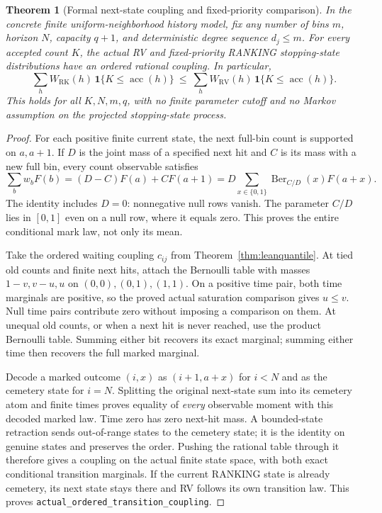 \documentclass[11pt]{article}
\newtheorem{theorem}{Theorem}
\newcommand{\RV}{\mathrm{RV}}
\newcommand{\RK}{\mathrm{RK}}
\begin{document}
\begin{theorem}[Formal next-state coupling and fixed-priority comparison]\label{thm:leanjoint}
In the concrete finite uniform-neighborhood history model, fix any
number of bins $m$, horizon $N$, capacity $q+1$, and deterministic degree
sequence $d_j\leq m$. For every accepted count $K$, the actual RV and
fixed-priority RANKING stopping-state distributions have an ordered
rational coupling. In particular,
\[
 \sum_h W_{\RK}(h)\,\mathbf 1\{K\leq\operatorname{acc}(h)\}
 \ \leq\
 \sum_h W_{\RV}(h)\,\mathbf 1\{K\leq\operatorname{acc}(h)\}.
\]
This holds for all $K,N,m,q$, with no finite parameter cutoff and no
Markov assumption on the projected stopping-state process.
\end{theorem}
\begin{proof}
For each positive finite current state, the next full-bin count is
supported on $a,a+1$. If $D$ is the joint mass of a specified next hit
and $C$ is its mass with a new full bin, every count observable satisfies
\[
 \sum_b w_b F(b)=(D-C)F(a)+CF(a+1)
   =D\sum_{x\in\{0,1\}}\operatorname{Ber}_{C/D}(x)F(a+x).
\]
The identity includes $D=0$: nonnegative null rows vanish. The parameter
$C/D$ lies in $[0,1]$ even on a null row, where it equals zero.
This proves the entire conditional mark law, not only its mean.

Take the ordered waiting coupling $c_{ij}$ from
Theorem~\ref{thm:leanquantile}. At tied old counts and finite next hits,
attach the Bernoulli table with masses $1-v,v-u,u$ on
$(0,0),(0,1),(1,1)$. On a positive time pair, both time marginals are
positive, so the proved actual saturation comparison gives $u\leq v$.
Null time pairs contribute zero without imposing a comparison on them.
At unequal old counts, or when a next hit is never reached, use the
product Bernoulli table. Summing either bit recovers its exact marginal;
summing either time then recovers the full marked marginal.

Decode a marked outcome $(i,x)$ as $(i+1,a+x)$ for $i<N$ and as the
cemetery state for $i=N$. Splitting the original next-state sum into
its cemetery atom and finite times proves equality of \emph{every}
observable moment with this decoded marked law. Time zero has zero
next-hit mass. A bounded-state retraction sends out-of-range states to
the cemetery state; it is the identity on genuine states and preserves
the order. Pushing the rational table through it therefore gives a
coupling on the actual finite state space, with both exact conditional
transition marginals. If the current RANKING state is already cemetery,
its next state stays there and RV follows its own transition law.
This proves \texttt{actual\_ordered\_transition\_coupling}.


\end{proof}
\end{document}
